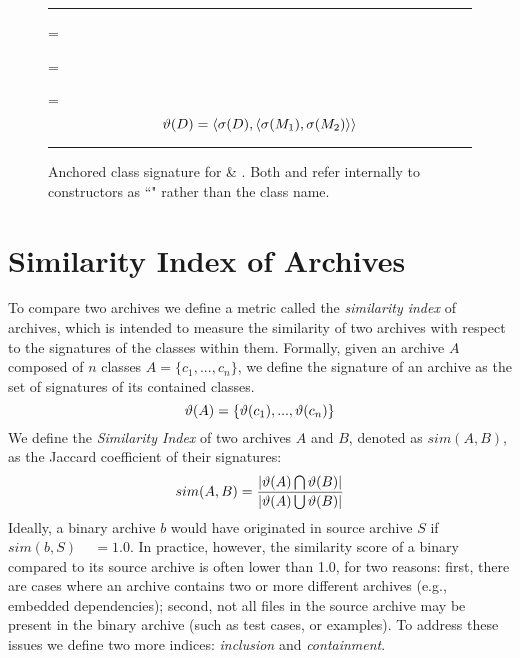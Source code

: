 \begin{figure}[htbp]
{
\hrule\vspace{1mm}
\scriptsize
\signature{D}\quad = \\
\signature{M_1} = \\
\signature{M_2} = 
\[\vartheta(D) = \langle \sigma(D), \langle \sigma(M_1),
\sigma(M_2)\rangle \rangle\]
}
\vspace{-4mm}\hrule\vspace{1mm}
  \caption{\small{Anchored class signature for  \& .
Both  and  refer internally to constructors as ``"
rather than the class name.}}
  \label{lst:cSig}
\end{figure}

\section{Similarity Index of Archives}
\label{sec:sim}

To compare two archives we define a metric called the \emph{similarity
index} of archives, which is intended to measure the similarity of two
archives with respect to the signatures of the classes within them.
Formally, given  an archive $A$ composed of $n$ classes $A = \{ c_1, ...  ,
c_n\}$, we define the signature of an archive as the set of signatures of
its contained classes.
\[\vartheta(A) = \{ \vartheta(c_1), ... , \vartheta(c_n)\} \]
We define the \emph{Similarity Index} of two archives $A$ and $B$, denoted as
$sim(A, B)$, as the Jaccard coefficient of their signatures:
\[ sim(A,B) = {{ | \vartheta(A) \bigcap
    \vartheta(B)| }\over{| \ensuremath{\vartheta(A)} \bigcup
    \ensuremath{\vartheta(B)}}| }\]
Ideally, a binary archive $b$ would have originated in source archive $S$
if $sim(b,S)$ ~ $= 1.0$. In practice, however, the similarity score of a binary compared to its
source archive is often lower than 1.0, for two
reasons: first, there are cases where an archive contains two or more
different archives (e.g., embedded dependencies); second, not all files in
the source archive may be present in the binary archive (such as test
cases, or examples). To address these issues we define two more indices:
\emph{inclusion} and \emph{containment}.


